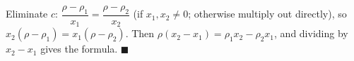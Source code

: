 Eliminate $c$: $\dfrac{\rho-\rho_1}{x_1}=\dfrac{\rho-\rho_2}{x_2}$ (if $x_1,x_2\ne0$; otherwise multiply out directly), so $x_2(\rho-\rho_1)=x_1(\rho-\rho_2)$. Then $\rho(x_2-x_1)=\rho_1x_2-\rho_2x_1$, and dividing by $x_2-x_1$ gives the formula. $\blacksquare$
